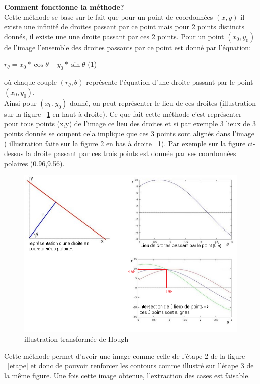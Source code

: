 \documentclass[12pt]{article}
\begin{document}
\textbf{Comment fonctionne la méthode?}\\

Cette méthode se base sur le fait que pour un point de coordonnées $(x,y)$ il existe une infinité de droites passant par ce point mais pour 2 points distincts donnés, il existe une une droite passant par ces 2 points. Pour un point $(x_0,y_0)$ de l'image l'ensemble des droites passants par ce point est donné par l'équation:
\begin{center}
$r_\theta = x_0*\cos \theta + y_0*\sin \theta$ (1)
\end{center}
où chaque couple $(r_\theta,\theta)$ représente l'équation d'une droite passant par le point $(x_0,y_0)$.\\
Ainsi pour $(x_0,y_0)$ donné, on peut représenter le lieu de ces droites (illustration sur la figure ~\ref{hg} en haut à droite). Ce que fait cette méthode c'est représenter pour tous points (x,y) de l'image ce lieu des droites et si par exemple 3 lieux de 3 points donnés se coupent cela implique que ces 3 points sont alignés dans l'image ( illustration faite sur la figure 2 en bas à droite ~\ref{hg}). Par exemple sur la figure ci-dessus la droite passant par ces trois points est donnée par ses coordonnées polaires (0.96,9.56).\\
\begin{figure}[!h]
	\centering
   	\includegraphics[scale = 0.7]{hg1.png}
   	\caption{\label{hg} illustration transformée de Hough }
\end{figure}
Cette méthode permet d'avoir une image comme celle de l'étape 2 de la figure ~\ref{etape} et donc de pouvoir renforcer les contours comme illustré sur l'étape 3 de la même figure. Une fois cette image obtenue, l'extraction des cases est faisable.
\end{document}
